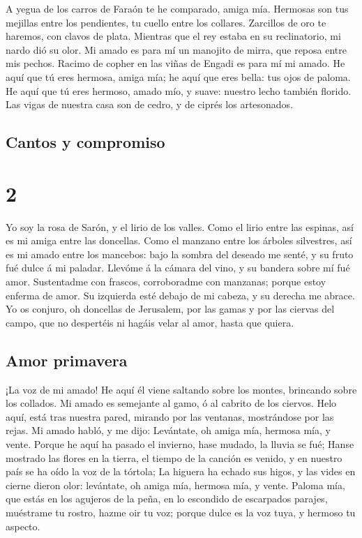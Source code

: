  A yegua de los carros de Faraón te he comparado, amiga mía.
 Hermosas son tus mejillas entre los pendientes, tu cuello
entre los collares.  Zarcillos de oro te haremos, con
clavos de plata.  Mientras que el rey estaba en su
reclinatorio, mi nardo dió su olor.  Mi amado es para mí un
manojito de mirra, que reposa entre mis pechos.  Racimo de
copher en las viñas de Engadi es para mí mi amado.  He aquí
que tú eres hermosa, amiga mía; he aquí que eres bella: tus ojos de
paloma.  He aquí que tú eres hermoso, amado mío, y suave:
nuestro lecho también florido.  Las vigas de nuestra casa
son de cedro, y de ciprés los artesonados.

\hypertarget{cantos-y-compromiso}{%
\subsection{Cantos y compromiso}\label{cantos-y-compromiso}}

\hypertarget{section-1}{%
\section{2}\label{section-1}}

 Yo soy la rosa de Sarón, y el lirio de los valles.
 Como el lirio entre las espinas, así es mi amiga entre las
doncellas.  Como el manzano entre los árboles silvestres,
así es mi amado entre los mancebos: bajo la sombra del deseado me senté,
y su fruto fué dulce á mi paladar.  Llevóme á la cámara del
vino, y su bandera sobre mí fué amor.  Sustentadme con
frascos, corroboradme con manzanas; porque estoy enferma de amor.
 Su izquierda esté debajo de mi cabeza, y su derecha me
abrace.  Yo os conjuro, oh doncellas de Jerusalem, por las
gamas y por las ciervas del campo, que no despertéis ni hagáis velar al
amor, hasta que quiera.

\hypertarget{amor-primavera}{%
\subsection{Amor primavera}\label{amor-primavera}}

 ¡La voz de mi amado! He aquí él viene saltando sobre los
montes, brincando sobre los collados.  Mi amado es semejante
al gamo, ó al cabrito de los ciervos. Helo aquí, está tras nuestra
pared, mirando por las ventanas, mostrándose por las rejas.
 Mi amado habló, y me dijo: Levántate, oh amiga mía,
hermosa mía, y vente.  Porque he aquí ha pasado el
invierno, hase mudado, la lluvia se fué;  Hanse mostrado
las flores en la tierra, el tiempo de la canción es venido, y en nuestro
país se ha oído la voz de la tórtola;  La higuera ha echado
sus higos, y las vides en cierne dieron olor: levántate, oh amiga mía,
hermosa mía, y vente.  Paloma mía, que estás en los
agujeros de la peña, en lo escondido de escarpados parajes, muéstrame tu
rostro, hazme oir tu voz; porque dulce es la voz tuya, y hermoso tu
aspecto.

